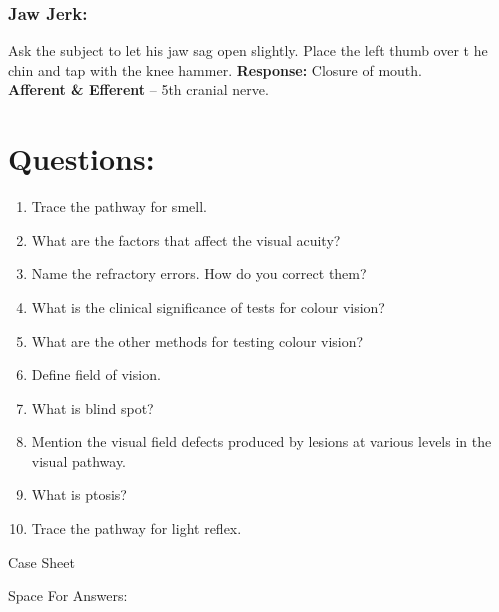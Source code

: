 \documentclass[a4paper,12pt,openany,twoside]{book}
\newcommand{\blankpageForCaseSheet}{
	\newpage
	\thispagestyle{plain}
	\begin{center}
		\huge Case Sheet 
	\end{center}
	\newpage
	\thispagestyle{plain}
	\mbox{}
	}
\newcommand{\blankpageForAnswers}{
	\newpage
	\thispagestyle{plain}
	\begin{center}
		\Large Space For Answers: 
	\end{center}
	}
\begin{document}
\subsubsection*{Jaw Jerk:}
Ask the subject to let his jaw sag open slightly. Place the left thumb over t he chin and tap with the knee hammer.
\textbf{Response:} Closure of mouth.\\
\textbf{Afferent \& Efferent} – 5th   cranial nerve.

\section*{Questions:}
\begin{enumerate}
\item{ Trace the pathway for smell.}
\item{ What are the factors that affect the visual acuity?}
\item{ Name the refractory errors. How do you correct them?}
\item{ What  is the clinical significance of tests for colour vision?}
\item{ What  are the other methods for testing colour vision?}
\item{ Define field of vision.}
\item{ What is blind spot?}
\item{ Mention the visual field defects produced by lesions at various levels in the visual pathway.}
\item{ What is ptosis?}
\item{ Trace the pathway for light reflex.}
\end{enumerate}
\blankpageForCaseSheet
\blankpageForAnswers
\end{document}
